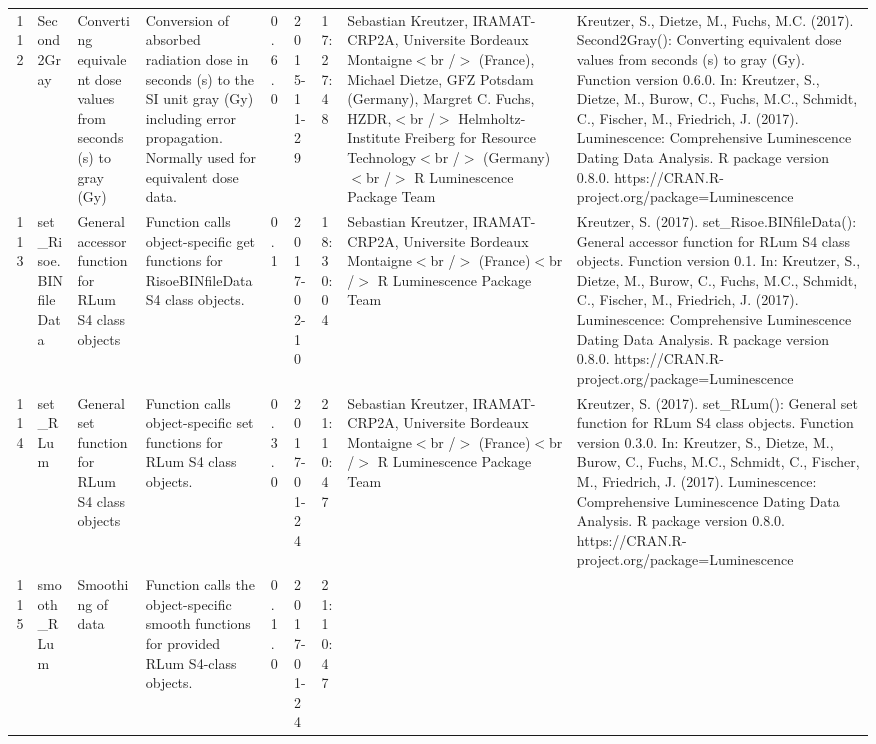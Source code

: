 \begin{table}[ht]
\begin{tabular}{rllllllll}
 \\ 
  112 & Second2Gray & Converting equivalent dose values from seconds (s) to gray (Gy) & Conversion of absorbed radiation dose in seconds (s) to the SI unit gray (Gy) including error propagation. Normally used for equivalent dose data. & 0.6.0 & 2015-11-29 & 17:27:48
 & Sebastian Kreutzer, IRAMAT-CRP2A, Universite Bordeaux Montaigne$<$br /$>$ (France),  Michael Dietze, GFZ Potsdam (Germany),  Margret C. Fuchs, HZDR,$<$br /$>$ Helmholtz-Institute Freiberg for Resource Technology$<$br /$>$ (Germany)$<$br /$>$  R Luminescence Package Team & Kreutzer, S., Dietze, M., Fuchs, M.C. (2017). Second2Gray(): Converting equivalent dose values from seconds (s) to gray (Gy). Function version 0.6.0. In: Kreutzer, S., Dietze, M., Burow, C., Fuchs, M.C., Schmidt, C., Fischer, M., Friedrich, J. (2017). Luminescence: Comprehensive Luminescence Dating Data Analysis. R package version 0.8.0. https://CRAN.R-project.org/package=Luminescence
 \\ 
  113 & set\_Risoe.BINfileData & General accessor function for RLum S4 class objects & Function calls object-specific get functions for RisoeBINfileData S4 class objects. & 0.1 & 2017-02-10 & 18:30:04
 & Sebastian Kreutzer, IRAMAT-CRP2A, Universite Bordeaux Montaigne$<$br /$>$ (France)$<$br /$>$  R Luminescence Package Team & Kreutzer, S. (2017). set\_Risoe.BINfileData(): General accessor function for RLum S4 class objects. Function version 0.1. In: Kreutzer, S., Dietze, M., Burow, C., Fuchs, M.C., Schmidt, C., Fischer, M., Friedrich, J. (2017). Luminescence: Comprehensive Luminescence Dating Data Analysis. R package version 0.8.0. https://CRAN.R-project.org/package=Luminescence
 \\ 
  114 & set\_RLum & General set function for RLum S4 class objects & Function calls object-specific set functions for RLum S4 class objects. & 0.3.0 & 2017-01-24 & 21:10:47
 & Sebastian Kreutzer, IRAMAT-CRP2A, Universite Bordeaux Montaigne$<$br /$>$ (France)$<$br /$>$  R Luminescence Package Team & Kreutzer, S. (2017). set\_RLum(): General set function for RLum S4 class objects. Function version 0.3.0. In: Kreutzer, S., Dietze, M., Burow, C., Fuchs, M.C., Schmidt, C., Fischer, M., Friedrich, J. (2017). Luminescence: Comprehensive Luminescence Dating Data Analysis. R package version 0.8.0. https://CRAN.R-project.org/package=Luminescence
 \\ 
  115 & smooth\_RLum & Smoothing of data & Function calls the object-specific smooth functions for provided RLum S4-class objects. & 0.1.0 & 2017-01-24 & 21:10:47

\end{tabular}
\end{table}
